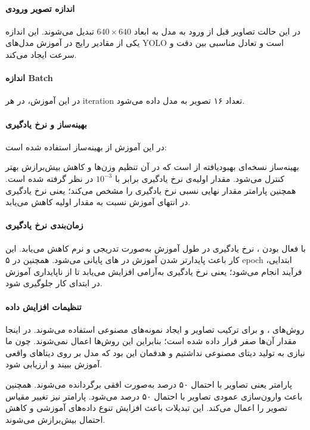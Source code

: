 \documentclass[a4paper, 10pt, twocolumn]{article}
\begin{document}
	\paragraph{اندازه تصویر ورودی}
	
	در این حالت تصاویر قبل از ورود به مدل به ابعاد $640 \times 640$ تبدیل می‌شوند. این اندازه یکی از مقادیر رایج در آموزش مدل‌های YOLO است و تعادل مناسبی بین دقت و سرعت ایجاد می‌کند.
	
	\paragraph{اندازه Batch} 
	در این آموزش، در هر iteration تعداد ۱۶ تصویر به مدل داده می‌شود.
	
	\paragraph{بهینه‌ساز و نرخ یادگیری}
	در این آموزش از بهینه‌ساز  استفاده شده است:
	
	بهینه‌ساز  نسخه‌ای بهبود‌یافته از  است که در آن تنظیم وزن‌ها و کاهش بیش‌برازش بهتر کنترل می‌شود. مقدار اولیه‌ی نرخ یادگیری برابر با $10^{-3}$ در نظر گرفته شده است. همچنین پارامتر  مقدار نهایی نسبی نرخ یادگیری را مشخص می‌کند؛ یعنی نرخ یادگیری در انتهای آموزش نسبت به مقدار اولیه کاهش می‌یابد.
	
	\paragraph{زمان‌بندی نرخ یادگیری}
	
	با فعال بودن ، نرخ یادگیری در طول آموزش به‌صورت تدریجی و نرم کاهش می‌یابد. این کار باعث پایدارتر شدن آموزش در های پایانی می‌شود. همچنین در ۵ epoch ابتدایی، فرآیند  انجام می‌شود؛ یعنی نرخ یادگیری به‌آرامی افزایش می‌یابد تا از ناپایداری آموزش در ابتدای کار جلوگیری شود.
	
	\paragraph{تنظیمات افزایش داده}
	
	روش‌های ،  و  برای ترکیب تصاویر و ایجاد نمونه‌های مصنوعی استفاده می‌شوند. در اینجا مقدار آن‌ها صفر قرار داده شده است؛ بنابراین این روش‌ها اعمال نمی‌شوند. چون ما نیازی به تولید دیتای مصنوعی نداشتیم و هدفمان این بود که مدل بر روی دیتاهای واقعی آموزش ببیند و ارزیابی شود.
	
	پارامتر  یعنی تصاویر با احتمال ۵۰ درصد به‌صورت افقی برگردانده می‌شوند. همچنین  باعث وارون‌سازی عمودی تصاویر با احتمال ۵۰ درصد می‌شود. پارامتر  نیز تغییر مقیاس تصویر را اعمال می‌کند. این تبدیلات باعث افزایش تنوع داده‌های آموزشی و کاهش احتمال بیش‌برازش می‌شوند.
	
\end{document}
